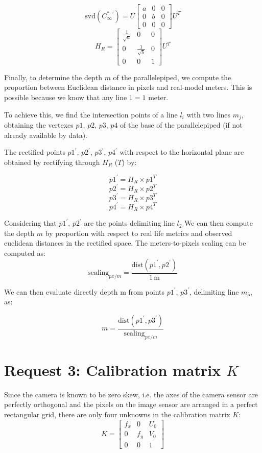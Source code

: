 \documentclass{Configuration_Files/PoliMi3i_thesis}
\begin{document}
\[
\text{svd}(C^{*}_{\infty}{}^{\prime}) = U \begin{bmatrix} a & 0 & 0 \\ 0 & b & 0 \\ 0 & 0 & 0 \end{bmatrix} U^{T}  
\]
\[
H_{R} = \begin{bmatrix} \frac{1}{\sqrt{a}} & 0 & 0 \\ 0 & \frac{1}{\sqrt{b}} & 0 \\ 0 & 0 & 1 \end{bmatrix} U^{T}  
\]

\noindent
Finally, to determine the depth \(m\) of the parallelepiped, we compute the proportion between Euclidean distance in pixels and real-model meters. This is possible because we know that any line \(1 = 1\) meter.

\noindent
To achieve this, we find the intersection points of a line \(l_{i}\) with two lines \(m_{j}\), obtaining the vertexes \(p1\), \(p2\), \(p3\), \(p4\) of the base of the parallelepiped (if not already available by data).

\noindent
The rectified points \(p1^{\prime}\), \(p2^{\prime}\), \(p3^{\prime}\), \(p4^{\prime}\) with respect to the horizontal plane are obtained by rectifying through \(H_{R}\) ($T$) by:

\[
p1^{\prime} = H_{R} \times p1^{T} 
\]
\[
p2^{\prime} = H_{R} \times p2^{T} 
\]
\[
p3^{\prime} = H_{R} \times p3^{T} 
\]
\[
p4^{\prime} = H_{R} \times p4^{T} 
\]

\noindent
Considering that \(p1^{\prime}\), \(p2^{\prime}\) are the points delimiting line \(l_{2}\) We can then compute the depth $m$ by proportion with respect to real life metrics and observed euclidean distances in the rectified space. The meters-to-pixels scaling can be computed as:
\[
\text{scaling}_{px/m} = \frac{\text{dist}(p1^{\prime}, p2^{\prime})}{1\,\text{m}}  
\]

We can then evaluate directly depth m from points \(p1^{\prime}\), \(p3^{\prime}\), delimiting line \(m_{5}\), as:

\[
m = \frac{\text{dist}(p1^{\prime}, p3^{\prime})}{\text{scaling}_{px/m}}  
\]

\newpage
\section{Request 3: Calibration matrix \(K\)}

\noindent
Since the camera is known to be zero skew, i.e. the axes of the camera sensor are perfectly orthogonal and the pixels on the image sensor are arranged in a perfect rectangular grid, there are only four unknowns in the calibration matrix \(K\):
\[
K = \begin{bmatrix} f_{x} & 0 & U_{0} \\ 0 & f_{y} & V_{0} \\ 0 & 0 & 1 \end{bmatrix}  
\]
\end{document}
